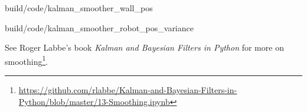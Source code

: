 \begin{svg}{build/code/kalman_smoother_wall_pos}
  \caption{Wall position with Kalman smoother}
  \label{fig:smoother_wall_pos}
\end{svg}

\begin{svg}{build/code/kalman_smoother_robot_pos_variance}
  \caption{Robot position variance with Kalman smoother}
  \label{fig:smoother_robot_pos_variance}
\end{svg}

See Roger Labbe's book \textit{Kalman and Bayesian Filters in Python} for more
on
smoothing\footnote{\url{https://github.com/rlabbe/Kalman-and-Bayesian-Filters-in-Python/blob/master/13-Smoothing.ipynb}}.

